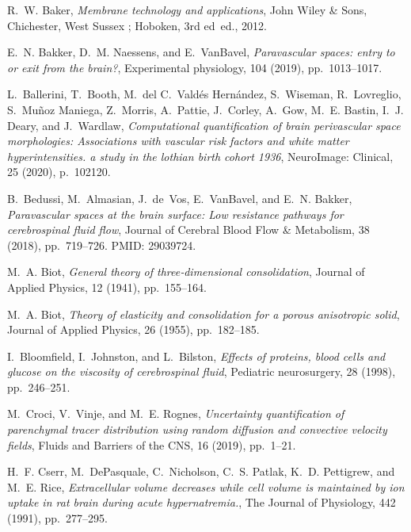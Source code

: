 \documentclass[10pt,letterpaper]{article}
\newcommand{\1}{^{(1)}}
\newcommand{\2}{^{(2)}}
\begin{document}
\begin{thebibliography}{10}
{\sc R.~W. Baker}, {\em Membrane technology and applications}, John Wiley \&
  Sons, Chichester, West Sussex ; Hoboken, 3rd ed~ed., 2012.

{\sc E.~N. Bakker, D.~M. Naessens, and E.~VanBavel}, {\em Paravascular spaces:
  entry to or exit from the brain?}, Experimental physiology, 104 (2019),
  pp.~1013--1017.

{\sc L.~Ballerini, T.~Booth, M.~del C.~{Valdés Hernández}, S.~Wiseman,
  R.~Lovreglio, S.~{Muñoz Maniega}, Z.~Morris, A.~Pattie, J.~Corley, A.~Gow,
  M.~E. Bastin, I.~J. Deary, and J.~Wardlaw}, {\em Computational quantification
  of brain perivascular space morphologies: Associations with vascular risk
  factors and white matter hyperintensities. a study in the lothian birth
  cohort 1936}, NeuroImage: Clinical, 25 (2020), p.~102120.

{\sc B.~Bedussi, M.~Almasian, J.~de~Vos, E.~VanBavel, and E.~N. Bakker}, {\em
  Paravascular spaces at the brain surface: Low resistance pathways for
  cerebrospinal fluid flow}, Journal of Cerebral Blood Flow \& Metabolism, 38
  (2018), pp.~719--726.
\newblock PMID: 29039724.

{\sc M.~A. Biot}, {\em General theory of three‐dimensional consolidation},
  Journal of Applied Physics, 12 (1941), pp.~155--164.

{\sc M.~A. Biot}, {\em Theory of elasticity and consolidation for a porous
  anisotropic solid}, Journal of Applied Physics, 26 (1955), pp.~182--185.

{\sc I.~Bloomfield, I.~Johnston, and L.~Bilston}, {\em Effects of proteins,
  blood cells and glucose on the viscosity of cerebrospinal fluid}, Pediatric
  neurosurgery, 28 (1998), pp.~246--251.

{\sc M.~Croci, V.~Vinje, and M.~E. Rognes}, {\em Uncertainty quantification of
  parenchymal tracer distribution using random diffusion and convective
  velocity fields}, Fluids and Barriers of the CNS, 16 (2019), pp.~1--21.

{\sc H.~F. Cserr, M.~DePasquale, C.~Nicholson, C.~S. Patlak, K.~D. Pettigrew,
  and M.~E. Rice}, {\em Extracellular volume decreases while cell volume is
  maintained by ion uptake in rat brain during acute hypernatremia.}, The
  Journal of Physiology, 442 (1991), pp.~277--295.


\end{thebibliography}
\end{document}
